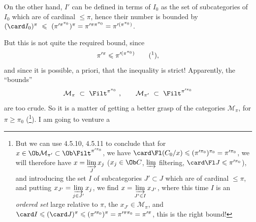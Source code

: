 On the other hand, $I'$ can be defined in terms of $I_0$ as the set of subcategories of $I_0$ which are of cardinal $\leqslant \pi$, hence their number is bounded by $(\card I_0)^\pi \ \leqslant \ (\pi'^{\pi^{\pi_0}})^\pi = \pi'^{\pi\pi^{\pi_0}} = \pi'^{(\pi^{\pi_0})}$.

But this is not quite the required bound, since
\[
\pi'^{\pi} \leqslant \pi'^{(\pi^{\pi_0})} \qquad \text{(\footnotemark)},
\]
%
and since it is possible, a priori, that the inequality
is strict! Apparently, the ``bounds''
\[
\mathcal{M}_\pi \ \subset \ \Filt^{\pi^{\pi_0}} \ , \qquad \mathcal{M}_{\pi'} \ \subset \ \Filt^{\pi'^{\pi_0}}
\]
are too crude. So it is a matter of getting a better grasp of the categories $\mathcal{M}_\pi$, for $\pi \geqslant \pi_0$ (\footnote{But we can use 4.5.10, 4.5.11 to conclude that for $x \in \Ob \mathcal{M}_{\pi'} \subset \Ob \Filt^{\pi'^{\pi_0}}$, we have $\card \Fl(C_0/x) \leqslant (\pi'^{\pi_0})^{\pi_0} = \pi'^{\pi_0}$, we will therefore have $x = \varinjlim\limits_{J} x_j$ ($x_j \in \Ob C$, $\varinjlim$ filtering, $\card \Fl J \leqslant \pi'^{\pi_0}$), and introducing the set $I$ of subcategories $J' \subset J$ which are of cardinal $\leqslant \pi$, and putting $x_{J'} = \varinjlim\limits_{j \in J'} x_j$, we find $x = \varinjlim\limits_{J' \in I} x_{J'}$, where this time $I$ is an \textit{ordered set} large relative to $\pi$, the $x_{J'} \in \mathcal{M}_\pi$, and $\card I \leqslant (\card J)^\pi \leqslant (\pi'^{\pi_0})^\pi = \pi'^{\pi\pi_0} = \pi'^{\pi}$, this is the right bound!}). I am going to venture a


